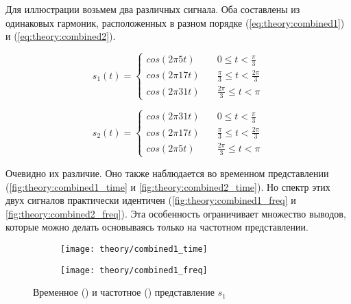 Для иллюстрации возьмем два различных сигнала. Оба составлены из одинаковых гармоник, расположенных в разном порядке (\autoref{eq:theory:combined1}) и (\autoref{eq:theory:combined2}).

\begin{equation}
  s_1(t) =
  \begin{cases}
    cos(2 \pi 5 t) & \quad 0 \leq t < \frac{\pi}{3} \\
    cos(2 \pi 17 t) & \quad \frac{\pi}{3} \leq t < \frac{2\pi}{3} \\
    cos(2 \pi 31 t) & \quad \frac{2\pi}{3} \leq t < \pi
  \end{cases}
  \label{eq:theory:combined1}
\end{equation}

\begin{equation}
  s_2(t) =
  \begin{cases}
    cos(2 \pi 31 t) & \quad 0 \leq t < \frac{\pi}{3} \\
    cos(2 \pi 17 t) & \quad \frac{\pi}{3} \leq t < \frac{2\pi}{3} \\
    cos(2 \pi 5 t) & \quad \frac{2\pi}{3} \leq t < \pi
  \end{cases}
  \label{eq:theory:combined2}
\end{equation}

Очевидно их различие. Оно также наблюдается во временном представлении (\autoref{fig:theory:combined1_time} и \autoref{fig:theory:combined2_time}). Но спектр этих двух сигналов практически идентичен (\autoref{fig:theory:combined1_freq} и \autoref{fig:theory:combined2_freq}). Эта особенность ограничивает множество выводов, которые можно делать основываясь только на частотном представлении.

\begin{figure}[h]
  \centering
  \begin{subfigure}{0.45\textwidth}
    \texttt{[image: theory/combined1\_time]}
    \caption{}
    \label{fig:theory:combined1_time}
  \end{subfigure}
  \begin{subfigure}{0.45\textwidth}
    \texttt{[image: theory/combined1\_freq]}
    \caption{}
    \label{fig:theory:combined1_freq}
  \end{subfigure}
  \caption{Временное () и частотное () представление $s_1$}
  \label{fig:theory:combined1}
\end{figure}

